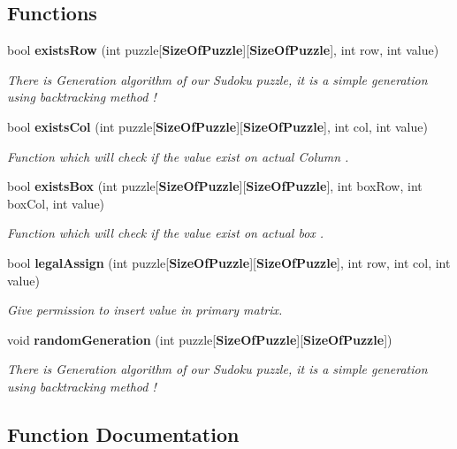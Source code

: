 \subsection*{Functions}
\begin{DoxyCompactItemize}
\item 
bool {\bf exists\+Row} (int puzzle[{\bf Size\+Of\+Puzzle}][{\bf Size\+Of\+Puzzle}], int row, int value)
\begin{DoxyCompactList}\small\item\em There is Generation algorithm of our Sudoku puzzle, it is a simple generation using backtracking method ! \end{DoxyCompactList}\item 
bool {\bf exists\+Col} (int puzzle[{\bf Size\+Of\+Puzzle}][{\bf Size\+Of\+Puzzle}], int col, int value)
\begin{DoxyCompactList}\small\item\em Function which will check if the value exist on actual Column . \end{DoxyCompactList}\item 
bool {\bf exists\+Box} (int puzzle[{\bf Size\+Of\+Puzzle}][{\bf Size\+Of\+Puzzle}], int box\+Row, int box\+Col, int value)
\begin{DoxyCompactList}\small\item\em Function which will check if the value exist on actual box . \end{DoxyCompactList}\item 
bool {\bf legal\+Assign} (int puzzle[{\bf Size\+Of\+Puzzle}][{\bf Size\+Of\+Puzzle}], int row, int col, int value)
\begin{DoxyCompactList}\small\item\em Give permission to insert value in primary matrix. \end{DoxyCompactList}\item 
void {\bf random\+Generation} (int puzzle[{\bf Size\+Of\+Puzzle}][{\bf Size\+Of\+Puzzle}])
\begin{DoxyCompactList}\small\item\em There is Generation algorithm of our Sudoku puzzle, it is a simple generation using backtracking method ! \end{DoxyCompactList}\end{DoxyCompactItemize}


\subsection{Function Documentation}
